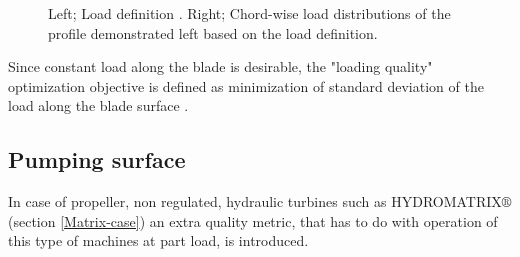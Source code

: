 \begin{figure}[h!]
\begin{minipage}[b]{0.5\linewidth}
 \centering
\end{minipage}
\begin{minipage}[b]{0.5\linewidth}
 \centering
\end{minipage}
\caption{Left; Load definition . Right; Chord-wise load distributions of the profile demonstrated left based on the load definition.}
\label{design-obj}
\end{figure}

Since constant load along the blade is desirable, the  "loading quality" optimization objective is defined as minimization of standard deviation of the load along the blade surface . 


\subsection{Pumping surface}
In case of propeller, non regulated, hydraulic turbines such as HYDROMATRIX$\circledR$ (section \ref{Matrix-case}) an extra quality metric, that has to do with operation of this type of machines at part load, is introduced.      

